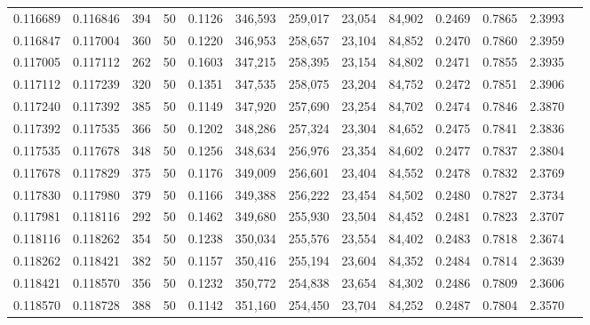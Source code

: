 \begin{tabular}{rrrrrrrrrrrrr}
0.116689 & 0.116846 &   394 &  50 &                                     0.1126 & 346,593 & 259,017 &  23,054 &  84,902 & 0.2469 & 0.7865 & 2.3993 \\
0.116847 & 0.117004 &   360 &  50 &                                     0.1220 & 346,953 & 258,657 &  23,104 &  84,852 & 0.2470 & 0.7860 & 2.3959 \\
0.117005 & 0.117112 &   262 &  50 &                                     0.1603 & 347,215 & 258,395 &  23,154 &  84,802 & 0.2471 & 0.7855 & 2.3935 \\
0.117112 & 0.117239 &   320 &  50 &                                     0.1351 & 347,535 & 258,075 &  23,204 &  84,752 & 0.2472 & 0.7851 & 2.3906 \\
0.117240 & 0.117392 &   385 &  50 &                                     0.1149 & 347,920 & 257,690 &  23,254 &  84,702 & 0.2474 & 0.7846 & 2.3870 \\
0.117392 & 0.117535 &   366 &  50 &                                     0.1202 & 348,286 & 257,324 &  23,304 &  84,652 & 0.2475 & 0.7841 & 2.3836 \\
0.117535 & 0.117678 &   348 &  50 &                                     0.1256 & 348,634 & 256,976 &  23,354 &  84,602 & 0.2477 & 0.7837 & 2.3804 \\
0.117678 & 0.117829 &   375 &  50 &                                     0.1176 & 349,009 & 256,601 &  23,404 &  84,552 & 0.2478 & 0.7832 & 2.3769 \\
0.117830 & 0.117980 &   379 &  50 &                                     0.1166 & 349,388 & 256,222 &  23,454 &  84,502 & 0.2480 & 0.7827 & 2.3734 \\
0.117981 & 0.118116 &   292 &  50 &                                     0.1462 & 349,680 & 255,930 &  23,504 &  84,452 & 0.2481 & 0.7823 & 2.3707 \\
0.118116 & 0.118262 &   354 &  50 &                                     0.1238 & 350,034 & 255,576 &  23,554 &  84,402 & 0.2483 & 0.7818 & 2.3674 \\
0.118262 & 0.118421 &   382 &  50 &                                     0.1157 & 350,416 & 255,194 &  23,604 &  84,352 & 0.2484 & 0.7814 & 2.3639 \\
0.118421 & 0.118570 &   356 &  50 &                                     0.1232 & 350,772 & 254,838 &  23,654 &  84,302 & 0.2486 & 0.7809 & 2.3606 \\
0.118570 & 0.118728 &   388 &  50 &                                     0.1142 & 351,160 & 254,450 &  23,704 &  84,252 & 0.2487 & 0.7804 & 2.3570 \\

\end{tabular}
